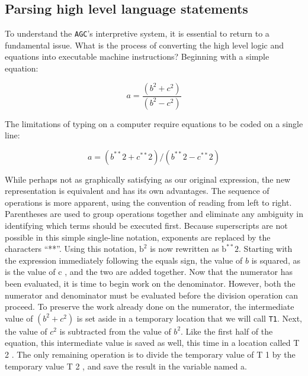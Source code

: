 \documentclass[refcap, oxford]{ahsan}
\begin{document}
\subsection{Parsing high level language statements}
To understand the \texttt{AGC}'s interpretive system, it is essential to return to a fundamental issue. What is the process of converting the high level logic and equations into executable machine instructions? Beginning with a simple equation:

$$
a=\frac{\left(b^{2}+c^{2}\right)}{\left(b^{2}-c^{2}\right)}
$$

The limitations of typing on a computer require equations to be coded on a single line:

$$
a=\left(b^{* *} 2+c^{* *} 2\right) /\left(b^{* *} 2-c^{* *} 2\right)
$$

While perhaps not as graphically satisfying as our original expression, the new representation is equivalent and has its own advantages. The sequence of operations is more apparent, using the convention of reading from left to right. Parentheses are used to group operations together and eliminate any ambiguity in identifying which terms should be executed first. Because superscripts are not possible in this simple single-line notation, exponents are replaced by the characters ``**''. Using this notation, $\mathrm{b}^{2}$ is now rewritten as $\mathrm{b}^{* *} 2$. Starting with the expression immediately following the equals sign, the value of $b$ is squared, as is the value of c , and the two are added together. Now that the numerator has been evaluated, it is time to begin work on the denominator. However, both the numerator and denominator must be evaluated before the division operation can proceed. To preserve the work already done on the numerator, the intermediate value of $\left(b^{2}+c^{2}\right)$ is set aside in a temporary location that we will call \texttt{T1}. Next, the value of $c^{2}$ is subtracted from the value of $b^{2}$. Like the first half of the equation, this intermediate value is saved as well, this time in a location called T 2 . The only remaining operation is to divide the temporary value of T 1 by the temporary value T 2 , and save the result in the variable named a.
\end{document}
